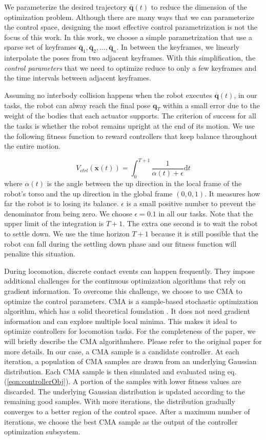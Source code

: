 We parameterize the desired trajectory $\bar{\mathbf{q}}(t)$ to reduce the dimension of the optimization problem. Although there are many ways that we can parameterize the control space, designing the most effective control parametrization is not the focus of this work. In this work, we choose a simple parametrization that use a sparse set of keyframes $\bar{\mathbf{q}}_1, \bar{\mathbf{q}}_2, ..., \bar{\mathbf{q}}_n$. In between the keyframes, we linearly interpolate the poses from two adjacent keyframes. With this simplification, the \emph{control parameters} that we need to optimize reduce to only a few keyframes and the time intervals between adjacent keyframes. 

Assuming no interbody collision happens when the robot executes $\bar{\mathbf{q}}(t)$, in our tasks, the robot can alway reach the final pose $\mathbf{q}_T$ within a small error due to the weight of the bodies that each actuator supports. The criterion of success for all the tasks is whether the robot remains upright at the end of its motion. We use the following fitness function to reward controllers that keep balance throughout the entire motion.

\begin{equation}
  V_{ctrl}(\mathbf{x}(t))=\int_0^{T+1} \frac{1}{\alpha(t)+\epsilon}\mathrm{d}t
  \label{eqn:controllerObj}
\end{equation}
where $\alpha(t)$ is the angle between the up direction in the local frame of the robot's torso and the up direction in the global frame $(0,0,1)$. It measures how far the robot is to losing its balance. $\epsilon$ is a small positive number to prevent the denominator from being zero. We choose $\epsilon=0.1$ in all our tasks. Note that the upper limit of the integration is $T+1$. The extra one second is to wait the robot to settle down. We use the time horizon $T+1$ because it is still possible that the robot can fall during the settling down phase and our fitness function will penalize this situation.

During locomotion, discrete contact events can happen frequently. They impose additional challenges for the continuous optimization algorithms that rely on gradient information. To overcome this challenge, we choose to use CMA to optimize the control parameters. CMA is a sample-based stochastic optimization algorithm, which has a solid theoretical foundation \cite{akimoto:2010,glasmachers:2010}. It does not need gradient information and can explore multiple local minima. This makes it ideal to optimize controllers for locomotion tasks. For the completeness of the paper, we will briefly describe the CMA algorithmhere. Please refer to the original paper \cite{Hansen:2009} for more details. In our case, a CMA sample is a candidate controller. At each iteration, a population of CMA samples are drawn from an underlying Gaussian distribution. Each CMA sample is then simulated and evaluated using eq.(\ref{eqn:controllerObj}). A portion of the samples with lower fitness values are discarded. The underlying Gaussian distribution is updated according to the remaining good samples. With more iterations, the distribution gradually converges to a better region of the control space. After a maximum number of iterations, we choose the best CMA sample as the output of the controller optimization subsystem.
